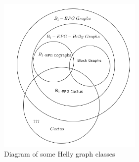  \begin{figure}[htb]	
 \center%
 \includegraphics[width=7cm]{./img/DiagramaB1Helly.png}
 \caption{Diagram of some Helly graph classes}
\label{fig:diagram}
\end{figure}  
 